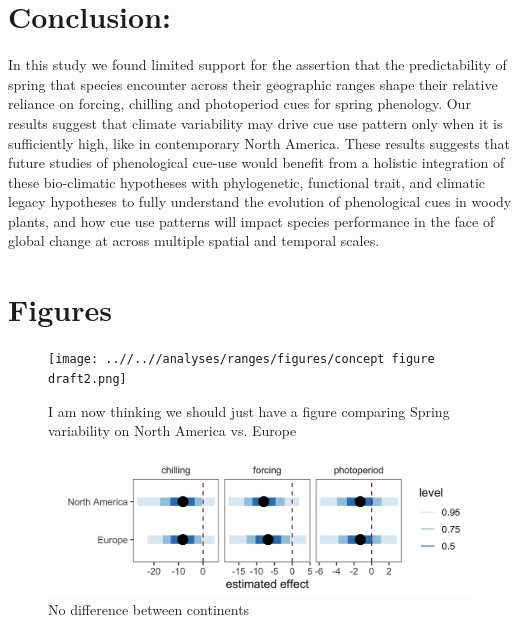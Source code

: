 \documentclass[12pt]{article}
\begin{document}
\section{Conclusion:}
In this study we found limited support for the assertion that the predictability of spring that species encounter across their geographic ranges shape their relative reliance on forcing, chilling and photoperiod cues for spring phenology. Our results suggest that climate variability may drive cue use pattern only when it is sufficiently high, like in contemporary North America. These results suggests that future studies of phenological cue-use would benefit from a holistic integration of these bio-climatic hypotheses with phylogenetic, functional trait, and climatic legacy hypotheses to fully understand the evolution of phenological cues in woody plants, and how cue use patterns will impact species performance in the face of global change at across multiple spatial and temporal scales.


\section*{Figures}

\begin{figure}[h!]
    \centering
 \texttt{[image: ..//..//analyses/ranges/figures/concept figure draft2.png]} 
    \caption{I am now thinking we should just have a figure comparing Spring variability on North America vs. Europe}%

    \label{fig:concept}
\end{figure}


\begin{figure}[h!]
    \centering
 \includegraphics[width=\textwidth]{..//..//analyses/ranges/figures/NAvEuPMM.jpeg} 
    \caption{No difference between continents}
    \label{fig:cont}
\end{figure}
\end{document}
